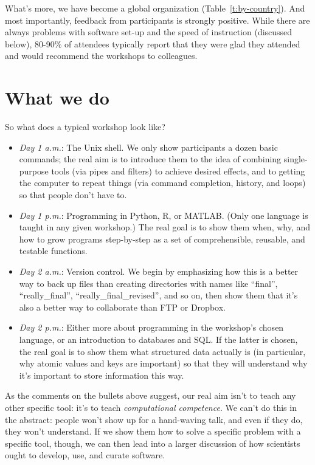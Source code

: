 \documentclass[10pt,a4paper,twocolumn]{article}
\begin{document}
What's more, we have become a global organization
(Table~\ref{t:by-country}).  And most importantly, feedback from
participants is strongly positive.  While there are always problems
with software set-up and the speed of instruction (discussed below),
80-90\% of attendees typically report that they were glad they
attended and would recommend the workshops to colleagues.

\section*{What we do}

So what does a typical workshop look like?

\begin{itemize}
\item
  \emph{Day 1 a.m.}: The Unix shell. We only show participants a dozen
  basic commands; the real aim is to introduce them to the idea of
  combining single-purpose tools (via pipes and filters) to achieve
  desired effects, and to getting the computer to repeat things (via
  command completion, history, and loops) so that people don't have
  to.
\item
  \emph{Day 1 p.m.}: Programming in Python, R, or MATLAB. (Only one
  language is taught in any given workshop.) The real goal is to show
  them when, why, and how to grow programs step-by-step as a set of
  comprehensible, reusable, and testable functions.
\item
  \emph{Day 2 a.m.}: Version control. We begin by emphasizing how this
  is a better way to back up files than creating directories with names
  like ``final'', ``really\_final'', ``really\_final\_revised'', and
  so on, then show them that it's also a better way to collaborate
  than FTP or Dropbox.
\item
  \emph{Day 2 p.m.}: Either more about programming in the workshop's
  chosen language, or an introduction to databases and SQL.  If the
  latter is chosen, the real goal is to show them what structured data
  actually is (in particular, why atomic values and keys are
  important) so that they will understand why it's important to store
  information this way.
\end{itemize}

As the comments on the bullets above suggest, our real aim isn't to
teach any other specific tool: it's to teach \emph{computational
competence}. We can't do this in the abstract: people won't show up
for a hand-waving talk, and even if they do, they won't understand. If
we show them how to solve a specific problem with a specific tool,
though, we can then lead into a larger discussion of how scientists
ought to develop, use, and curate software.
\end{document}
